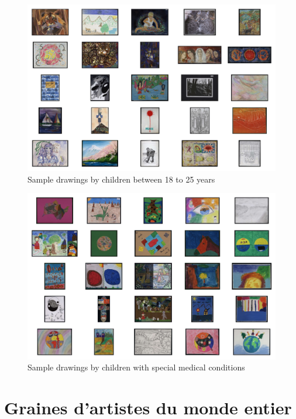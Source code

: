 \begin{figure}[ht]
\centering
\includegraphics[width=\textwidth]{images/sample_drawings/sample_drawings_18_25.png}
  \caption{Sample drawings by children between 18 to 25 years}
  \label{fig:drawing-18_25}
\end{figure}

\begin{figure}[ht]
\centering
\includegraphics[width=\textwidth]{images/sample_drawings/sample_drawings_MS.png}
  \caption{Sample drawings by children with special medical conditions}
  \label{fig:drawing-MS}
\end{figure}


\section{Graines d’artistes du monde entier}

